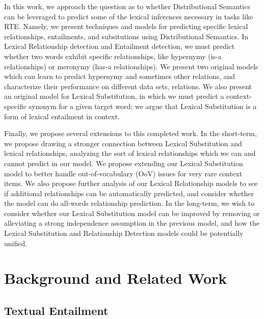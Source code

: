 \documentclass[letterpaper]{article}
\begin{document}
In this work, we approach the question as to whether Distributional Semantics
can be leveraged to predict some of the lexical inferences necessary in tasks
like RTE. Namely, we present techniques and models for predicting specific
lexical relationships, entailments, and subsitutions using Distributional
Semantics. In Lexical Relationship detection and Entailment detection, we must
predict whether two words exhibit specific relationships, like hypernymy (is-a
relationships) or meronymy (has-a relationships). We present two original
models which can learn to predict hypernymy and sometimes other relations,
and characterize their performance on different data sets, relations. We also
present an original model for Lexical Substitution, in which we must predict a
context-specific synonym for a given target word; we argue that Lexical
Substitution is a form of lexical entailment in context.

Finally, we propose several extensions to this completed work. In the
short-term, we propose drawing a stronger connection between Lexical
Substitution and lexical relationships, analyzing the sort of lexical
relationships which we can and cannot predict in our model. We propose
extending our Lexical Substitution model to better handle out-of-vocabulary
(OoV) issues for very rare context items. We also propose further analysis of
our Lexical Relationship models to see if additional relationships can be
automatically predicted, and consider whether the model can do all-words
relationship prediction.  In the long-term, we wish to consider whether our
Lexical Substitution model can be improved by removing or alleviating a strong
independence assumption in the previous model, and how the Lexical Substitution
and Relationship Detection models could be potentially unified.


\section{Background and Related Work}

\subsection{Textual Entailment}
\end{document}
